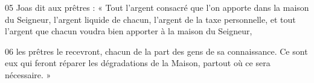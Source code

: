 

05 Joas dit aux prêtres : « Tout l’argent consacré que l’on apporte dans la maison du Seigneur, l’argent liquide de chacun, l’argent de la taxe personnelle, et tout l’argent que chacun voudra bien apporter à la maison du Seigneur,


06 les prêtres le recevront, chacun de la part des gens de sa connaissance. Ce sont eux qui feront réparer les dégradations de la Maison, partout où ce sera nécessaire. »
